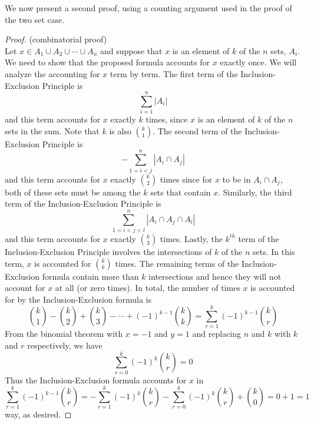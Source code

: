 \documentclass[handout]{ximera}
\begin{document}
We now present a second proof, using a counting argument used in the proof of the two set case.

\begin{proof}(combinatorial proof)\\
Let $x \in A_1 \cup A_2 \cup \cdots \cup A_n$ and suppose that $x$ is an element of $k$ of the $n$ sets, $A_i$.
We need to show that the proposed formula accounts for $x$ exactly once. 
We will analyze the accounting for $x$ term by term. The first term of the Inclusion-Exclusion Principle is 
\[
\sum_{i=1}^n |A_i|
\]
and this term accounts for $x$ exactly $k$ times, since $x$ is an element of $k$ of the $n$ sets in the sum. 
Note that $k$ is also $\binom{k}{1}$.
The second term of the Inclusion-Exclusion Principle is 
\[
-\sum_{1 =i < j}^n |A_i \cap A_j|
\]
and this term accounts for $x$ exactly $\binom{k}{2}$ times since for $x$ to be in $A_i \cap A_j$, both of these sets must be among the $k$ sets that contain $x$.
Similarly, the third term of the Inclusion-Exclusion Principle is 
\[
\sum_{1 =i < j< l}^n |A_i \cap A_j \cap A_l|
\]
and this term accounts for $x$ exactly $\binom{k}{3}$ times.
Lastly, the $k^{th}$ term of the Inclusion-Exclusion Principle involves the intersections of $k$ of the $n$ sets. In this term,  $x$ is accounted  for $\binom{k}{k}$ times.
The remaining terms of the Inclusion-Exclusion formula contain more than $k$ intersections 
and hence they will not account for $x$ at all (or zero times). In total, the number of times $x$ is accounted for by the Inclusion-Exclusion formula is
\[
\binom{k}{1} - \binom{k}{2} + \binom{k}{3} - \cdots + (-1)^{k-1} \binom{k}{k} = \sum_{r=1}^k (-1)^{k-1} \binom{k}{r}
\]
From the binomial theorem with $x = -1$ and $y = 1$ and replacing $n$ and $k$ with $k$ and $r$ respectively, we have
\[
\sum_{r=0}^k (-1)^{k} \binom{k}{r} = 0
\]
Thus the Inclusion-Exclusion formula accounts for $x$ in 
\[
\sum_{r=1}^k (-1)^{k-1} \binom{k}{r} = -\sum_{r=1}^k (-1)^{k} \binom{k}{r}
-\sum_{r=0}^k (-1)^{k} \binom{k}{r} + \binom{k}{0} = 0+1 =1
\]
way, as desired.
\end{proof}
\end{document}

